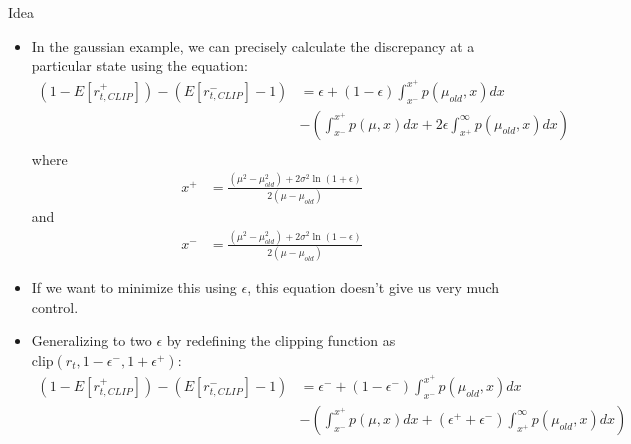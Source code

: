 \documentclass{beamer}
\begin{document}
\begin{frame}{Idea}
    \begin{itemize}
        \item In the gaussian example, we can precisely calculate the
            discrepancy at a particular state using the equation:
        \scriptsize
        \begin{align*}
            (1 - E[r_{t, CLIP}^{+}]) - (E[r_{t, CLIP}^{-}] - 1)
            &=
            \epsilon
            + 
            (1 - \epsilon)
            \int_{x^{-}}^{x^{+}}p(\mu_{old}, x)dx
            \\
            &-\left(\int_{x^{-}}^{x^{+}}p(\mu, x)dx 
            +2\epsilon
            \int_{x^{+}}^{\infty}p(\mu_{old}, x)dx\right)\\
        \end{align*}
        \normalsize
        where
        \begin{align*}
            x^{+} &=
            \frac{(\mu^2 - \mu_{old}^2)
                + 2\sigma^2\ln\left(1 + \epsilon\right)}
                {2(\mu - \mu_{old})}
        \end{align*}
        and
        \begin{align*}
            x^{-} &=
            \frac{(\mu^2 - \mu_{old}^2)
                + 2\sigma^2\ln\left(1 - \epsilon\right)}
                {2(\mu - \mu_{old})}
        \end{align*}
        \framebreak
        \item If we want to minimize this using $\epsilon$, this equation
            doesn't give us very much control.
        \item Generalizing to two $\epsilon$ by redefining the clipping
            function as $\text{clip} (r_t, 1 - \epsilon^-, 1 + \epsilon^+)$:
        \scriptsize
        \begin{align*}
            (1 - E[r_{t, CLIP}^{+}]) - (E[r_{t, CLIP}^{-}] - 1)
            &=
            \epsilon^-
            + 
            (1 - \epsilon^-)
            \int_{x^{-}}^{x^{+}}p(\mu_{old}, x)dx
            \\
            &-\left(\int_{x^{-}}^{x^{+}}p(\mu, x)dx 
            +(\epsilon^+ + \epsilon^-)
            \int_{x^{+}}^{\infty}p(\mu_{old}, x)dx\right)\\
        \end{align*}
        \normalsize

\end{itemize}
\end{frame}
\end{document}
